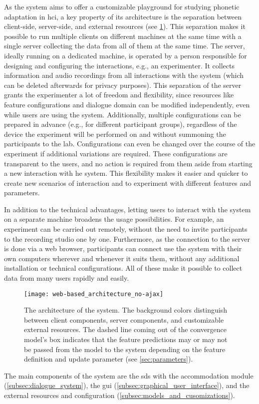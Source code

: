 As the system aims to offer a customizable playground for studying phonetic adaptation in \ac{hci}, a key property of its architecture is the separation between client-side, server-side, and external resources (see \cref{fig:web-based_architecture}).
This separation makes it possible to run multiple clients on different machines at the same time with a single server collecting the data from all of them at the same time.
The server, ideally running on a dedicated machine, is operated by a person responsible for designing and configuring the interactions, e.g., an experimenter.
It collects information and audio recordings from all interactions with the system (which can be deleted afterwards for privacy purposes).
This separation of the server grants the experimenter a lot of freedom and flexibility, since resources like feature configurations and dialogue domain can be modified independently, even while users are using the system.
Additionally, multiple configurations can be prepared in advance (e.g., for different participant groups), regardless of the device the experiment will be performed on and without summoning the participants to the lab.
Configurations can even be changed over the course of the experiment if additional variations are required.
These configurations are transparent to the users, and no action is required from them aside from starting a new interaction with he system.
This flexibility makes it easier and quicker to create new scenarios of interaction and to experiment with different features and parameters.

In addition to the technical advantages, letting users to interact with the system on a separate machine broadens the usage possibilities.
For example, an experiment can be carried out remotely, without the need to invite participants to the recording studio one by one.
Furthermore, as the connection to the server is done via a web browser, participants can connect use the system with their own computers wherever and whenever it suits them, without any additional installation or technical configurations.
All of these make it possible to collect data from many users rapidly and easily.
%
\begin{figure}[t]
	\centering
	\texttt{[image: web-based\_architecture\_no-ajax]}
	\caption[Architecture of the web-based system]
		{The architecture of the system.
		The background colors distinguish between client components, server components, and customizable external resources.
		The dashed line coming out of the convergence model's box indicates that the feature predictions may or may not be passed from the model to the system depending on the feature definition and update parameter (see \cref{sec:parameters}).}
	\label{fig:web-based_architecture}
\end{figure}
%
The main components of the system are the \ac{sds} with the accommodation module (\cref{subsec:dialogue_system}), the \ac{gui} (\cref{subsec:graphical_user_interface}), and the external resources and configuration (\cref{subsec:models_and_cusomizations}).

